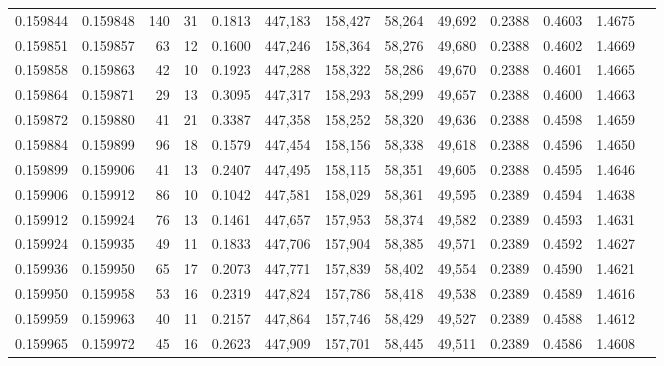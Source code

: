 \begin{tabular}{rrrrrrrrrrrrr}
0.159844 & 0.159848 &   140 &  31 &                                     0.1813 & 447,183 & 158,427 &  58,264 &  49,692 & 0.2388 & 0.4603 & 1.4675 \\
0.159851 & 0.159857 &    63 &  12 &                                     0.1600 & 447,246 & 158,364 &  58,276 &  49,680 & 0.2388 & 0.4602 & 1.4669 \\
0.159858 & 0.159863 &    42 &  10 &                                     0.1923 & 447,288 & 158,322 &  58,286 &  49,670 & 0.2388 & 0.4601 & 1.4665 \\
0.159864 & 0.159871 &    29 &  13 &                                     0.3095 & 447,317 & 158,293 &  58,299 &  49,657 & 0.2388 & 0.4600 & 1.4663 \\
0.159872 & 0.159880 &    41 &  21 &                                     0.3387 & 447,358 & 158,252 &  58,320 &  49,636 & 0.2388 & 0.4598 & 1.4659 \\
0.159884 & 0.159899 &    96 &  18 &                                     0.1579 & 447,454 & 158,156 &  58,338 &  49,618 & 0.2388 & 0.4596 & 1.4650 \\
0.159899 & 0.159906 &    41 &  13 &                                     0.2407 & 447,495 & 158,115 &  58,351 &  49,605 & 0.2388 & 0.4595 & 1.4646 \\
0.159906 & 0.159912 &    86 &  10 &                                     0.1042 & 447,581 & 158,029 &  58,361 &  49,595 & 0.2389 & 0.4594 & 1.4638 \\
0.159912 & 0.159924 &    76 &  13 &                                     0.1461 & 447,657 & 157,953 &  58,374 &  49,582 & 0.2389 & 0.4593 & 1.4631 \\
0.159924 & 0.159935 &    49 &  11 &                                     0.1833 & 447,706 & 157,904 &  58,385 &  49,571 & 0.2389 & 0.4592 & 1.4627 \\
0.159936 & 0.159950 &    65 &  17 &                                     0.2073 & 447,771 & 157,839 &  58,402 &  49,554 & 0.2389 & 0.4590 & 1.4621 \\
0.159950 & 0.159958 &    53 &  16 &                                     0.2319 & 447,824 & 157,786 &  58,418 &  49,538 & 0.2389 & 0.4589 & 1.4616 \\
0.159959 & 0.159963 &    40 &  11 &                                     0.2157 & 447,864 & 157,746 &  58,429 &  49,527 & 0.2389 & 0.4588 & 1.4612 \\
0.159965 & 0.159972 &    45 &  16 &                                     0.2623 & 447,909 & 157,701 &  58,445 &  49,511 & 0.2389 & 0.4586 & 1.4608 \\

\end{tabular}
